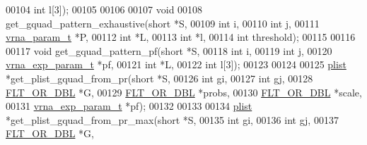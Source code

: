 \begin{DoxyCode}
00104                            \textcolor{keywordtype}{int}          l[3]);
00105 
00106 
00107 \textcolor{keywordtype}{void}
00108 get\_gquad\_pattern\_exhaustive(\textcolor{keywordtype}{short}        *S,
00109                              \textcolor{keywordtype}{int}          i,
00110                              \textcolor{keywordtype}{int}          j,
00111                              \hyperlink{group__energy__parameters_structvrna__param__s}{vrna\_param\_t} *P,
00112                              \textcolor{keywordtype}{int}          *L,
00113                              \textcolor{keywordtype}{int}          *l,
00114                              \textcolor{keywordtype}{int}          threshold);
00115 
00116 
00117 \textcolor{keywordtype}{void} get\_gquad\_pattern\_pf(\textcolor{keywordtype}{short}             *S,
00118                           \textcolor{keywordtype}{int}               i,
00119                           \textcolor{keywordtype}{int}               j,
00120                           \hyperlink{group__energy__parameters_structvrna__exp__param__s}{vrna\_exp\_param\_t}  *pf,
00121                           \textcolor{keywordtype}{int}               *L,
00122                           \textcolor{keywordtype}{int}               l[3]);
00123 
00124 
00125 \hyperlink{group__struct__utils__plist_structvrna__elem__prob__s}{plist} *get\_plist\_gquad\_from\_pr(\textcolor{keywordtype}{short}            *S,
00126                                \textcolor{keywordtype}{int}              gi,
00127                                \textcolor{keywordtype}{int}              gj,
00128                                \hyperlink{group__data__structures_ga31125aeace516926bf7f251f759b6126}{FLT\_OR\_DBL}       *G,
00129                                \hyperlink{group__data__structures_ga31125aeace516926bf7f251f759b6126}{FLT\_OR\_DBL}       *probs,
00130                                \hyperlink{group__data__structures_ga31125aeace516926bf7f251f759b6126}{FLT\_OR\_DBL}       *scale,
00131                                \hyperlink{group__energy__parameters_structvrna__exp__param__s}{vrna\_exp\_param\_t} *pf);
00132 
00133 
00134 \hyperlink{group__struct__utils__plist_structvrna__elem__prob__s}{plist} *get\_plist\_gquad\_from\_pr\_max(\textcolor{keywordtype}{short}            *S,
00135                                    \textcolor{keywordtype}{int}              gi,
00136                                    \textcolor{keywordtype}{int}              gj,
00137                                    \hyperlink{group__data__structures_ga31125aeace516926bf7f251f759b6126}{FLT\_OR\_DBL}       *G,

\end{DoxyCode}
